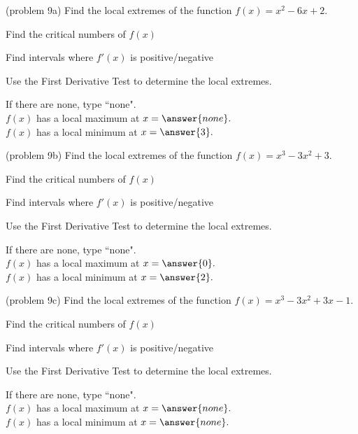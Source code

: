 \documentclass[handout]{ximera}
\begin{document}
\begin{problem}(problem 9a)
Find the local extremes of the function $f(x) = x^2 - 6x + 2.$\\
\begin{hint}
Find the critical numbers of $f(x)$
\end{hint}
\begin{hint}
Find intervals where $f'(x)$ is positive/negative
\end{hint}

\begin{hint}
Use the First Derivative Test to determine the local extremes.
\end{hint}

If there are none, type ``none".\\
$f(x)$ has a local maximum at $x = \answer{none}.$\\
$f(x)$ has a local minimum at $x = \answer{3}.$
\end{problem}


\begin{problem}(problem 9b)
Find the local extremes of the function $f(x) = x^3 - 3x^2 + 3.$\\
\begin{hint}
Find the critical numbers of $f(x)$
\end{hint}
\begin{hint}
Find intervals where $f'(x)$ is positive/negative
\end{hint}
\begin{hint}
Use the First Derivative Test to determine the local extremes.
\end{hint}

If there are none, type ``none".\\
$f(x)$ has a local maximum at $x = \answer{0}.$\\
$f(x)$ has a local minimum at $x = \answer{2}.$
\end{problem}


\begin{problem}(problem 9c)
Find the local extremes of the function $f(x) = x^3 - 3x^2 +3x -1.$\\
\begin{hint}
Find the critical numbers of $f(x)$
\end{hint}
\begin{hint}
Find intervals where $f'(x)$ is positive/negative
\end{hint}
\begin{hint}
Use the First Derivative Test to determine the local extremes.
\end{hint}

If there are none, type ``none".\\
$f(x)$ has a local maximum at $x = \answer{none}.$\\
$f(x)$ has a local minimum at $x = \answer{none}.$
\end{problem}
\end{document}
